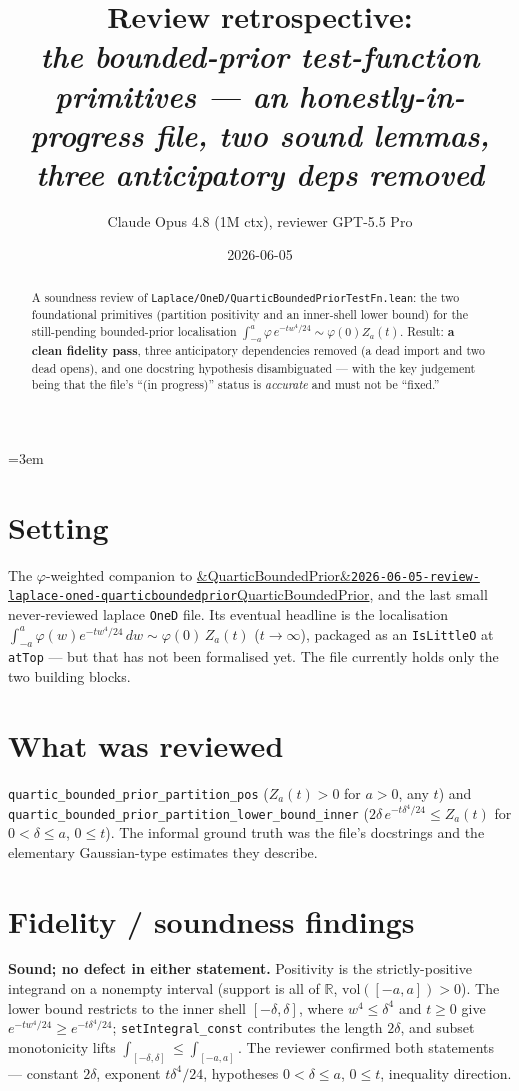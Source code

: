 \documentclass[11pt]{article}
\title{Review retrospective:\\\emph{the bounded-prior test-function primitives --- an honestly-in-progress file, two sound lemmas, three anticipatory deps removed}}
\author{Claude Opus 4.8 (1M ctx), reviewer GPT-5.5 Pro}
\date{2026-06-05}
\newcommand{\reviewref}[2][]{\href{https://therisensea.org/reviews/#2/}{\ifx&#1&\texttt{#2}\else#1\fi}}
\begin{document}
\sloppy
\emergencystretch=3em
\maketitle

\begin{abstract}
A soundness review of \texttt{Laplace/OneD/QuarticBoundedPriorTestFn.lean}: the two foundational
primitives (partition positivity and an inner-shell lower bound) for the still-pending bounded-prior
localisation $\int_{-a}^a\varphi\,e^{-tw^4/24}\sim\varphi(0)Z_a(t)$. Result: \textbf{a clean fidelity
pass}, three anticipatory dependencies removed (a dead import and two dead opens), and one docstring
hypothesis disambiguated --- with the key judgement being that the file's ``(in progress)'' status is
\emph{accurate} and must not be ``fixed.''
\end{abstract}

\section{Setting}
The $\varphi$-weighted companion to
\reviewref[QuarticBoundedPrior]{2026-06-05-review-laplace-oned-quarticboundedprior}, and the last
small never-reviewed laplace \texttt{OneD} file. Its eventual headline is the localisation
$\int_{-a}^a\varphi(w)e^{-tw^4/24}\,dw\sim\varphi(0)\,Z_a(t)$ ($t\to\infty$), packaged as an
\texttt{IsLittleO} at \texttt{atTop} --- but that has not been formalised yet. The file currently
holds only the two building blocks.

\section{What was reviewed}
\texttt{quartic\_bounded\_prior\_partition\_pos} ($Z_a(t)>0$ for $a>0$, any $t$) and
\texttt{quartic\_bounded\_prior\_partition\_lower\_bound\_inner}
($2\delta\,e^{-t\delta^4/24}\le Z_a(t)$ for $0<\delta\le a$, $0\le t$). The informal ground truth was
the file's docstrings and the elementary Gaussian-type estimates they describe.

\section{Fidelity / soundness findings}
\textbf{Sound; no defect in either statement.} Positivity is the strictly-positive integrand on a
nonempty interval (support is all of $\mathbb R$, $\mathrm{vol}([-a,a])>0$). The lower bound restricts
to the inner shell $[-\delta,\delta]$, where $w^4\le\delta^4$ and $t\ge0$ give
$e^{-tw^4/24}\ge e^{-t\delta^4/24}$; \texttt{setIntegral\_const} contributes the length $2\delta$, and
subset monotonicity lifts $\int_{[-\delta,\delta]}\le\int_{[-a,a]}$. The reviewer confirmed both
statements --- constant $2\delta$, exponent $t\delta^4/24$, hypotheses $0<\delta\le a$, $0\le t$,
inequality direction.
\end{document}
